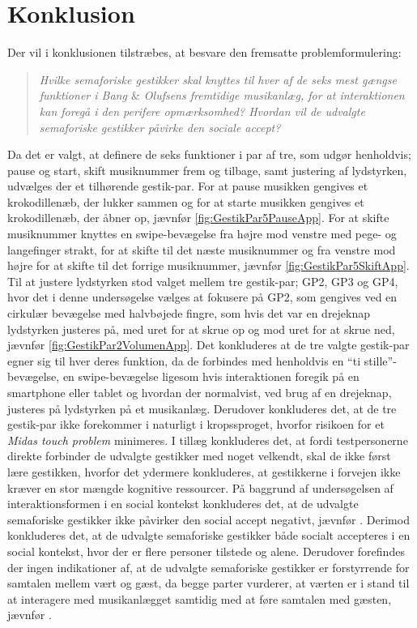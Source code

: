 \chapter{Konklusion}
\label{Konklusion}
%
Der vil i konklusionen tilstræbes, at besvare den fremsatte problemformulering: 
%
\begin{quotation}
	\noindent
	\textit{Hvilke semaforiske gestikker skal knyttes til hver af de seks mest gængse funktioner i Bang $\&$ Olufsens fremtidige musikanlæg, for at interaktionen kan foregå i den perifere opmærksomhed?\blankline
		Hvordan vil de udvalgte semaforiske gestikker påvirke den sociale accept?}\blankline
\end{quotation}
%
Da det er valgt, at definere de seks funktioner i par af tre, som udgør henholdvis; pause og start, skift musiknummer frem og tilbage, samt justering af lydstyrken, udvælges der et tilhørende gestik-par. For at pause musikken gengives et krokodillenæb, der lukker sammen og for at starte musikken gengives et krokodillenæb, der åbner op, jævnfør \autoref{fig:GestikPar5PauseApp}. For at skifte musiknummer knyttes en swipe-bevægelse fra højre mod venstre med pege- og langefinger strakt, for at skifte til det næste musiknummer og fra venstre mod højre for at skifte til det forrige musiknummer, jævnfør \autoref{fig:GestikPar5SkiftApp}. Til at justere lydstyrken stod valget mellem tre gestik-par; GP2, GP3 og GP4, hvor det i denne undersøgelse vælges at fokusere på GP2, som gengives ved en cirkulær bevægelse med halvbøjede fingre, som hvis det var en drejeknap lydstyrken justeres på, med uret for at skrue op og mod uret for at skrue ned, jævnfør \autoref{fig:GestikPar2VolumenApp}. Det konkluderes at de tre valgte gestik-par egner sig til hver deres funktion, da de forbindes med henholdvis en \enquote{ti stille}-bevægelse, en swipe-bevægelse ligesom hvis interaktionen foregik på en smartphone eller tablet og hvordan der normalvist, ved brug af en drejeknap, justeres på lydstyrken på et musikanlæg. Derudover konkluderes det, at de tre gestik-par ikke forekommer i naturligt i kropssproget, hvorfor risikoen for et \textit{Midas touch problem} minimeres. I tillæg konkluderes det, at fordi testpersonerne direkte forbinder de udvalgte gestikker med noget velkendt, skal de ikke først lære gestikken, hvorfor det ydermere konkluderes, at gestikkerne i forvejen ikke kræver en stor mængde kognitive ressourcer.\blankline 
%
På baggrund af undersøgelsen af interaktionsformen i en social kontekst konkluderes det, at de udvalgte semaforiske gestikker ikke påvirker den social accept negativt, jævnfør . Derimod konkluderes det, at de udvalgte semaforiske gestikker både socialt accepteres i en social kontekst, hvor der er flere personer tilstede og alene. Derudover forefindes der ingen indikationer af, at de udvalgte semaforiske gestikker er forstyrrende for samtalen mellem vært og gæst, da begge parter vurderer, at værten er i stand til at interagere med musikanlægget samtidig med at føre samtalen med gæsten, jævnfør . 

